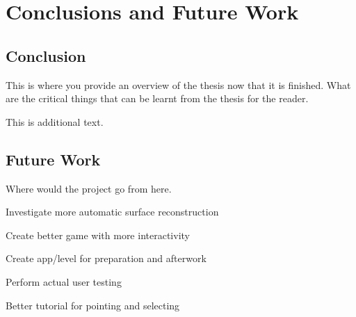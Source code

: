 \chapter{Conclusions and Future Work}
\label{chap:conclusion}

\section{Conclusion}

This is where you provide an overview of the thesis now that it is finished.  What are the critical things that can be learnt from the thesis for the reader.

This is additional text.

\section{Future Work}
\label{sec:future}
Where would the project go from here.

Investigate more automatic surface reconstruction

Create better game with more interactivity

Create app/level for preparation and afterwork

Perform actual user testing

Better tutorial for pointing and selecting
